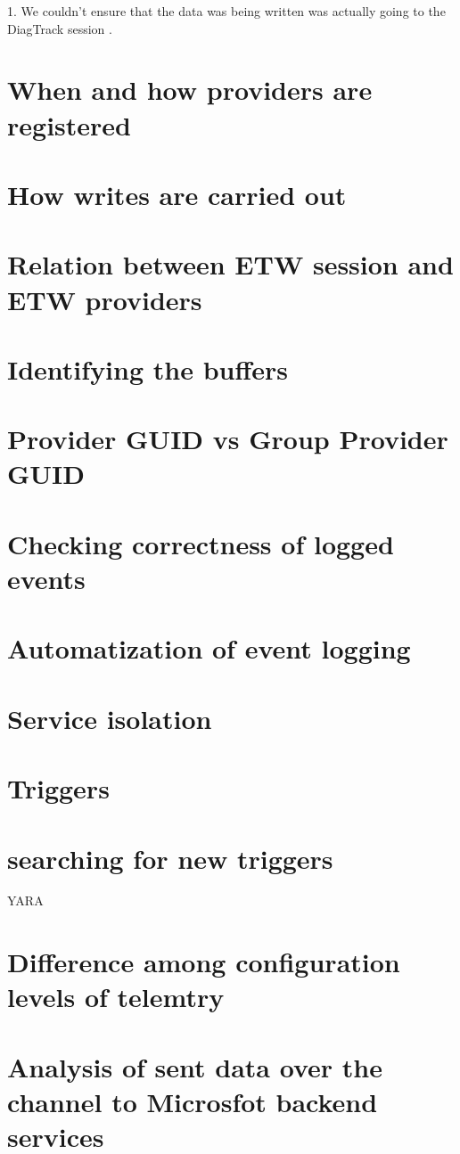 \newpage
{\huge 1. We couldn't ensure that the data was being written was actually going to the DiagTrack session .}

\section{When and how providers are registered}
\section{How writes are carried out}
\section{Relation between ETW session and ETW providers}
\section{Identifying the buffers}
\section{Provider GUID vs Group Provider GUID}
\section{Checking correctness of logged events}
\section{Automatization of event logging}
\section{Service isolation}
\section{Triggers}
\section{searching for new triggers} YARA
\section{Difference among configuration levels of telemtry}
\section{Analysis of sent data over the channel to Microsfot backend services}
